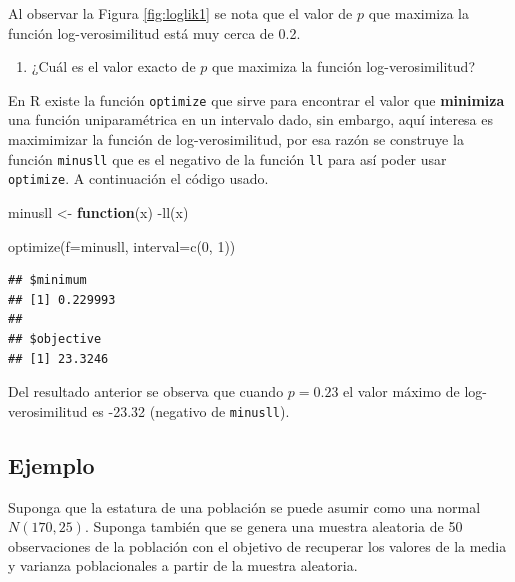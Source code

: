 \documentclass[
]{book}
\makeatletter
\newenvironment{Shaded}{\begin{snugshade}}{\end{snugshade}}
\newcommand{\AttributeTok}[1]{\textcolor[rgb]{0.77,0.63,0.00}{#1}}
\newcommand{\ControlFlowTok}[1]{\textcolor[rgb]{0.13,0.29,0.53}{\textbf{#1}}}
\newcommand{\DecValTok}[1]{\textcolor[rgb]{0.00,0.00,0.81}{#1}}
\newcommand{\FunctionTok}[1]{\textcolor[rgb]{0.00,0.00,0.00}{#1}}
\newcommand{\NormalTok}[1]{#1}
\newcommand{\OtherTok}[1]{\textcolor[rgb]{0.56,0.35,0.01}{#1}}
\newcommand{\SpecialCharTok}[1]{\textcolor[rgb]{0.00,0.00,0.00}{#1}}
\providecommand{\tightlist}{%
  \setlength{\itemsep}{0pt}\setlength{\parskip}{0pt}}
\newenvironment{kframe}{%
\medskip{}
\setlength{\fboxsep}{.8em}
 \def\at@end@of@kframe{}%
 \ifinner\ifhmode%
  \def\at@end@of@kframe{\end{minipage}}%
  \begin{minipage}{\columnwidth}%
 \fi\fi%
 \def\FrameCommand##1{\hskip\@totalleftmargin \hskip-\fboxsep
 \colorbox{shadecolor}{##1}\hskip-\fboxsep
     \hskip-\linewidth \hskip-\@totalleftmargin \hskip\columnwidth}%
 \MakeFramed {\advance\hsize-\width
   \@totalleftmargin\z@ \linewidth\hsize
   \@setminipage}}%
 {\par\unskip\endMakeFramed%
 \at@end@of@kframe}
\renewenvironment{Shaded}{\begin{kframe}}{\end{kframe}}
\makeatother
\begin{document}
Al observar la Figura \ref{fig:loglik1} se nota que el valor de \(p\) que maximiza la función log-verosimilitud está muy cerca de 0.2.

\begin{enumerate}
\def\labelenumi{\arabic{enumi})}
\setcounter{enumi}{4}
\tightlist
\item
  ¿Cuál es el valor exacto de \(p\) que maximiza la función log-verosimilitud?
\end{enumerate}

En R existe la función \texttt{optimize} que sirve para encontrar el valor que \textbf{minimiza} una función uniparamétrica en un intervalo dado, sin embargo, aquí interesa es maximimizar la función de log-verosimilitud, por esa razón se construye la función \texttt{minusll} que es el negativo de la función \texttt{ll} para así poder usar \texttt{optimize}. A continuación el código usado. 

\begin{Shaded}
\begin{Highlighting}[]
\NormalTok{minusll }\OtherTok{\textless{}{-}} \ControlFlowTok{function}\NormalTok{(x) }\SpecialCharTok{{-}}\FunctionTok{ll}\NormalTok{(x)}

\FunctionTok{optimize}\NormalTok{(}\AttributeTok{f=}\NormalTok{minusll, }\AttributeTok{interval=}\FunctionTok{c}\NormalTok{(}\DecValTok{0}\NormalTok{, }\DecValTok{1}\NormalTok{))}
\end{Highlighting}
\end{Shaded}

\begin{verbatim}
## $minimum
## [1] 0.229993
## 
## $objective
## [1] 23.3246
\end{verbatim}

Del resultado anterior se observa que cuando \(p=0.23\) el valor máximo de log-verosimilitud es -23.32 (negativo de \texttt{minusll}).

\hypertarget{ejemplo-50}{%
\subsection*{Ejemplo}\label{ejemplo-50}}

Suponga que la estatura de una población se puede asumir como una normal \(N(170, 25)\). Suponga también que se genera una muestra aleatoria de 50 observaciones de la población con el objetivo de recuperar los valores de la media y varianza poblacionales a partir de la muestra aleatoria.
\end{document}
